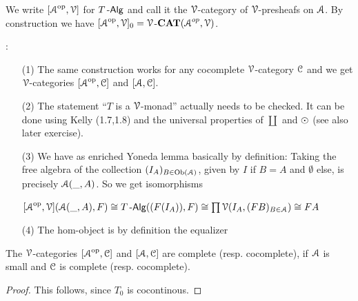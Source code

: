 \documentclass[a4paper,11pt,oneside,openany]{scrbook}
\begin{document}
\begin{defn}
   We write $[\A^{\op},\V]$ for $T\Alg$ and call it the $\V$-category of $\V$-presheafs on $\A$. By construction we have 
   $[\A^{\op},\V]_{0} = \V$-$\CAT(\A^{op},\V)$.
\end{defn}

\begin{rmk}:
   \begin{itemize}
      \item[(1)]
         The same construction works for any cocomplete $\V$-category $\C$ and we get $\V$-categories $[\A^{\op},\C]$ and $[\A,\C]$.
      \item[(2)]
         The statement ``$T$ is a $\V$-monad'' actually needs to be checked. It can be done using Kelly (1.7,1.8)   %
         and the universal properties of $\coprod$ and $\copw$ (see also later exercise).
      \item[(3)]
         We have as enriched Yoneda lemma basically by definition: Taking the free algebra of the collection $(I_{A})_{B \in \Ob(\A)}$, given by 
         $I$ if $B=A$ and $\emptyset$ else, is precisely $\A(\_,A)$. So we get isomorphisms 
            \begin{center}
               $\lbrack \A^{\op},\V \rbrack (\A(\_,A),F) \iso T\Alg((F(I_{A})),F) \iso \prod \V(I_{A},(FB)_{B\in \A}) \iso FA$
            \end{center}
      \item[(4)]
         The hom-object is by definition the equalizer
            \begin{center}
            \end{center}
   \end{itemize}
\end{rmk}

\begin{prop}
   The $\V$-categories $[\A^{\op},\C]$ and $[\A,\C]$ are complete (resp. cocomplete), if $\A$ is small and $\C$ is complete (resp. cocomplete).
\end{prop}

\begin{proof}
   This follows, since $T_{0}$ is cocontinous. 
\end{proof}
\end{document}
